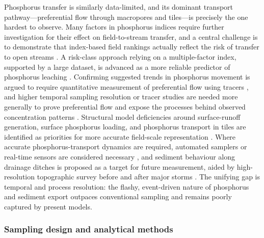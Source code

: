 Phosphorus transfer is similarly data-limited, and its dominant transport pathway---preferential flow through macropores and tiles---is precisely the one hardest to observe. Many factors in phosphorus indices require further investigation for their effect on field-to-stream transfer, and a central challenge is to demonstrate that index-based field rankings actually reflect the risk of transfer to open streams \parencite{Bechmann2007}. A risk-class approach relying on a multiple-factor index, supported by a large dataset, is advanced as a more reliable predictor of phosphorus leaching \parencite{Beauchemin2003}. Confirming suggested trends in phosphorus movement is argued to require quantitative measurement of preferential flow using tracers \parencite{Salazar2011}, and higher temporal sampling resolution or tracer studies are needed more generally to prove preferential flow and expose the processes behind observed concentration patterns \parencite{Tiemeyer2009}. Structural model deficiencies around surface-runoff generation, surface phosphorus loading, and phosphorus transport in tiles are identified as priorities for more accurate field-scale representation \parencite{Apostel2021}. Where accurate phosphorus-transport dynamics are required, automated samplers or real-time sensors are considered necessary \parencite{Dialameh2022}, and sediment behaviour along drainage ditches is proposed as a target for future measurement, aided by high-resolution topographic survey before and after major storms \parencite{Warsta2014}. The unifying gap is temporal and process resolution: the flashy, event-driven nature of phosphorus and sediment export outpaces conventional sampling and remains poorly captured by present models.

\subsubsection{Sampling design and analytical methods}

